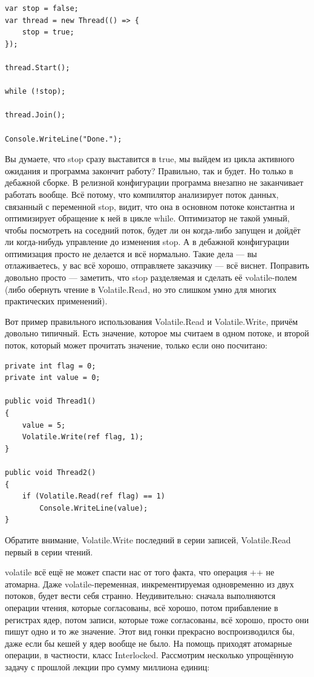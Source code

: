 \documentclass{../../text-style}
\begin{document}
\begin{verbatim}
var stop = false;
var thread = new Thread(() => {
    stop = true;
});

thread.Start();

while (!stop);

thread.Join();

Console.WriteLine("Done.");
\end{verbatim}

Вы думаете, что stop сразу выставится в true, мы выйдем из цикла активного ожидания и программа закончит работу? Правильно, так и будет. Но только в дебажной сборке. В релизной конфигурации программа внезапно не заканчивает работать вообще. Всё потому, что компилятор анализирует поток данных, связанный с переменной stop, видит, что она в основном потоке константна и оптимизирует обращение к ней в цикле while. Оптимизатор не такой умный, чтобы посмотреть на соседний поток, будет ли он когда-либо запущен и дойдёт ли когда-нибудь управление до изменения stop. А в дебажной конфигурации оптимизация просто не делается и всё нормально. Такие дела --- вы отлаживаетесь, у вас всё хорошо, отправляете заказчику --- всё виснет. Поправить довольно просто --- заметить, что stop разделяемая и сделать её volatile-полем (либо обернуть чтение в Volatile.Read, но это слишком умно для многих практических применений).

Вот пример правильного использования Volatile.Read и Volatile.Write, причём довольно типичный. Есть значение, которое мы считаем в одном потоке, и второй поток, который может прочитать значение, только если оно посчитано:

\begin{verbatim}
private int flag = 0;
private int value = 0;

public void Thread1()
{
    value = 5;
    Volatile.Write(ref flag, 1);
}

public void Thread2()
{
    if (Volatile.Read(ref flag) == 1)
        Console.WriteLine(value);
}
\end{verbatim}

Обратите внимание, Volatile.Write последний в серии записей, Volatile.Read первый в серии чтений.

volatile всё ещё не может спасти нас от того факта, что операция ++ не атомарна. Даже volatile-переменная, инкрементируемая одновременно из двух потоков, будет вести себя странно. Неудивительно: сначала выполняются операции чтения, которые согласованы, всё хорошо, потом прибавление в регистрах ядер, потом записи, которые тоже согласованы, всё хорошо, просто они пишут одно и то же значение. Этот вид гонки прекрасно воспроизводился бы, даже если бы кешей у ядер вообще не было. На помощь приходят атомарные операции, в частности, класс Interlocked. Рассмотрим несколько упрощённую задачу с прошлой лекции про сумму миллиона единиц:
\end{document}
